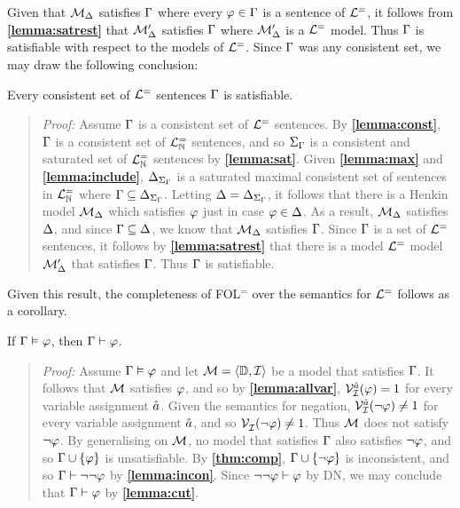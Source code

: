 Given that $\mathcal{M}_{\Delta}$ satisfies $\Gamma$ where every $\varphi\in\Gamma$ is a sentence of $\mathcal{L}^{=}$, it follows from \textbf{\ref{lemma:satrest}} that $\mathcal{M}'_{\Delta}$ satisfies $\Gamma$ where $\mathcal{M}'_{\Delta}$ is a $\mathcal{L}^{=}$ model. 
Thus $\Gamma$ is satisfiable with respect to the models of $\mathcal{L}^{=}$.
Since $\Gamma$ was any consistent set, we may draw the following conclusion:

  \begin{Tthm} \label{thm:comp}
    Every consistent set of $\mathcal{L}^{=}$ sentences $\Gamma$ is satisfiable. 
  \end{Tthm}

\begin{quote} 
  \textit{Proof:} 
  Assume $\Gamma$ is a consistent set of $\mathcal{L}^{=}$ sentences.
  By \textbf{\ref{lemma:const}}, $\Gamma$ is a consistent set of $\mathcal{L}^{=}_{\mathbb{N}}$ sentences, and so $\Sigma_{\Gamma}$ is a consistent and saturated set of $\mathcal{L}^{=}_{\mathbb{N}}$ sentences by \textbf{\ref{lemma:sat}}. 
  Given \textbf{\ref{lemma:max}} and \textbf{\ref{lemma:include}}, $\Delta_{\Sigma_{\Gamma}}$ is a saturated maximal consistent set of sentences in $\mathcal{L}^{=}_{\mathbb{N}}$ where $\Gamma\subseteq\Delta_{\Sigma_{\Gamma}}$.
  Letting $\Delta=\Delta_{\Sigma_{\Gamma}}$, it follows that there is a Henkin model $\mathcal{M}_{\Delta}$ which satisfies $\varphi$ just in case $\varphi\in\Delta$.
  As a result, $\mathcal{M}_{\Delta}$ satisfies $\Delta$, and since $\Gamma\subseteq\Delta$, we know that $\mathcal{M}_{\Delta}$ satisfies $\Gamma$.
  Since $\Gamma$ is a set of $\mathcal{L}^{=}$ sentences, it follows by \textbf{\ref{lemma:satrest}} that there is a model $\mathcal{L}^{=}$ model $\mathcal{M}'_{\Delta}$ that satisfies $\Gamma$.
  Thus $\Gamma$ is satisfiable.

\end{quote}

Given this result, the completeness of FOL$^=$ over the semantics for $\mathcal{L}^{=}$ follows as a corollary. 

\begin{Cthm}[Completeness] \label{cor:Completeness}
  If $\Gamma\vDash\varphi$, then $\Gamma\vdash\varphi$.
\end{Cthm}

\begin{quote} 
  \textit{Proof:} Assume $\Gamma\vDash\varphi$ and let $\mathcal{M}=\langle\mathbb{D},\mathcal{I}\rangle$ be a model that satisfies $\Gamma$.
  It follows that $\mathcal{M}$ satisfies $\varphi$, and so by \textbf{\ref{lemma:allvar}}, $\mathcal{V}_{\mathcal{I}}^{\hat{a}}(\varphi)=1$ for every variable assignment $\hat{a}$.
  Given the semantics for negation, $\mathcal{V}_{\mathcal{I}}^{\hat{a}}(\neg\varphi)\neq 1$ for every variable assignment $\hat{a}$, and so $\mathcal{V}_{\mathcal{I}}^{}(\neg\varphi)\neq 1$.
  Thus $\mathcal{M}$ does not satisfy $\neg\varphi$.
  By generalising on $\mathcal{M}$, no model that satisfies $\Gamma$ also satisfies $\neg\varphi$, and so $\Gamma\cup\lbrace\varphi\rbrace$ is unsatisfiable. 
  By \textbf{\ref{thm:comp}}, $\Gamma\cup\lbrace\neg\varphi\rbrace$ is inconsistent, and so $\Gamma\vdash\neg\neg\varphi$ by \textbf{\ref{lemma:incon}}.
  Since $\neg\neg\varphi\vdash\varphi$ by DN, we may conclude that $\Gamma\vdash\varphi$ by \textbf{\ref{lemma:cut}}.
\end{quote}

